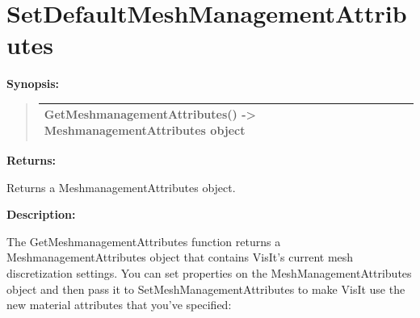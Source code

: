 \documentclass[letterpaper,10pt,english]{sphinxmanual}
\begin{document}
\section{SetDefaultMeshManagementAttributes}
\label{functions:setdefaultmeshmanagementattributes}
\begin{DUlineblock}{0em}
\item[] \textbf{Synopsis:}
\end{DUlineblock}
\begin{quote}

\begin{tabulary}{\linewidth}{|L|}
\hline

GetMeshmanagementAttributes() -\textgreater{} MeshmanagementAttributes object
\\
\hline\end{tabulary}

\end{quote}

\begin{DUlineblock}{0em}
\item[] 
\item[] \textbf{Returns:}
\item[] Returns a MeshmanagementAttributes object.
\item[] 
\item[] \textbf{Description:}
\item[] The GetMeshmanagementAttributes function returns a MeshmanagementAttributes object
that contains VisIt's current mesh discretization settings.
You can set properties on the MeshManagementAttributes object and then pass it to
SetMeshManagementAttributes to make VisIt use the new material attributes that
you've specified:
\end{DUlineblock}

\begin{DUlineblock}{0em}
\item[] 
\end{DUlineblock}
\end{document}
